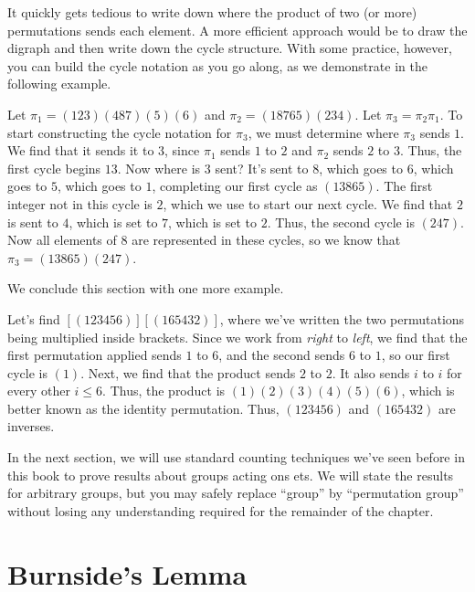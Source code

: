 It quickly gets tedious to write down where the product of two (or
more) permutations sends each element. A more efficient approach would
be to draw the digraph and then write down the cycle structure. With
some practice, however, you can build the cycle notation as you go
along, as we demonstrate in the following example.

\begin{example}
  Let $\pi_1=(123)(487)(5)(6)$ and $\pi_2=(18765)(234)$. Let $\pi_3 =
  \pi_2\pi_1$. To start constructing the cycle notation for $\pi_3$,
  we must determine where $\pi_3$ sends $1$. We find that it sends it
  to $3$, since $\pi_1$ sends $1$ to $2$ and $\pi_2$ sends $2$ to
  $3$. Thus, the first cycle begins $13$. Now where is $3$ sent?  It's
  sent to $8$, which goes to $6$, which goes to $5$, which goes to
  $1$, completing our first cycle as $(13865)$. The first integer not
  in this cycle is $2$, which we use to start our next cycle. We find
  that $2$ is sent to $4$, which is set to $7$, which is set to
  $2$. Thus, the second cycle is $(247)$. Now all elements of $8$ are
  represented in these cycles, so we know that $\pi_3 = (13865)(247)$.
\end{example}

We conclude this section with one more example.

\begin{example}
  Let's find $[(123456)][(165432)]$, where we've written the two
  permutations being multiplied inside brackets. Since we work from
  \emph{right} to \emph{left}, we find that the first permutation
  applied sends $1$ to $6$, and the second sends $6$ to $1$, so our
  first cycle is $(1)$. Next, we find that the product sends $2$ to
  $2$. It also sends $i$ to $i$ for every other $i\leq 6$. Thus, the
  product is $(1)(2)(3)(4)(5)(6)$, which is better known as the
  identity permutation. Thus, $(123456)$ and $(165432)$ are inverses.
\end{example}

In the next section, we will use standard counting techniques we've
seen before in this book to prove results about groups acting ons
ets. We will state the results for arbitrary groups, but you may
safely replace ``group'' by ``permutation group'' without losing any
understanding required for the remainder of the chapter.

\section{Burnside's Lemma}\label{s:polya:burnside}

